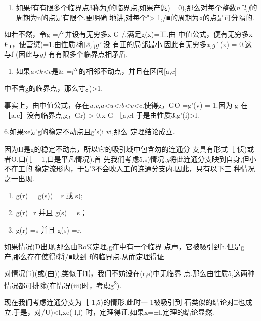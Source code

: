 \documentclass{article}
\begin{document}
\begin{enumerate}
\def\labelenumi{\arabic{enumi}.}
\setcounter{enumi}{3}
\item
  如果f有有限多个临界点3称为\emph{f}的临界点,如果产愆)
  =0),那么对每个整数\emph{n\^{}l,f}的周期为n的点是有限个.更明确
  地讲,对每个"\textgreater{} 1,/■的周期为«的点是可分隔的.
\end{enumerate}

如若不然，令g =产并设有无穷多x G /,满足g(x)=工.由 中值公式，便有无穷多x
€，，使营愆)=1.由性质2和\emph{3,\textbackslash{}g'} \textbar{}没
有正的局部最小.因此有无穷多\emph{x,g'} (x) = 0.这与f (因此与\emph{g)}
有有限多个临界点相矛盾.

\begin{enumerate}
\def\labelenumi{\arabic{enumi}.}
\setcounter{enumi}{4}
\item
  如果\emph{a\textless{}k\textless{}c}是\&
  =产的相邻不动点，并且在区间{[}a,c{]}
\end{enumerate}

中不含g的临界点，那么寸。)\textgreater{}1.

事实上，由中值公式，存在\emph{u,v,a\textless{}u\textless{}:b\textless{}v\textless{}c,}使得g，GO
=g'(v) = 1.因为 g 在［a,c］没有临界点,g，Gr) \textgreater{} 0,x G ［a,cl
于是由性质3,g'(i)\textgreater{}l.

6.如果xe是g的稳定不动点且\textbar{}g's)i vi,那么 定理结论成立.

因为H是g的稳定不动点，所以它的吸引域中包含勿的连通分
支具有形式［-侦)或者O,口(［--- 1,口是平凡情况).首
先我们考虑5,s)情况.\emph{g}将此连通分支映到自身,但小不在工的
稳定流形内，于是3不会映入工的连通分支内.因此，只有以下三 种情况之一出现.

\begin{enumerate}
\def\labelenumi{(\roman{enumi})}
\item
  g(r) = g(s)(= \emph{r} 或 s);
\item
  g(r)=r 并且 g(s) = s；
\item
  g(r) =s 并且 g(s) =r.
\end{enumerate}

如果情况(D出现,那么由Ro\%定理,g在中有一个临界 点声，它被吸引到h.但是g
=产,那么存在使得f将/■映到 f的临界点.从而定理得证.

对情况(ii)(或(由)),类似于⑴，我们不妨设在(r,s)中无临界
点.那么由性质5,这两种情况都可排除(在情况(iii)时，考虑g\textsuperscript{2}).

现在我们考虑连通分支为［-1,5)的情形.此时一 1被吸引到
石类似的结论对□也成立.于是，对\textbar{}/U)\textbar{}\textless{}l,xe(-l,l)
时，定理得证.如果x=±l,定理的结论显然.
\end{document}

